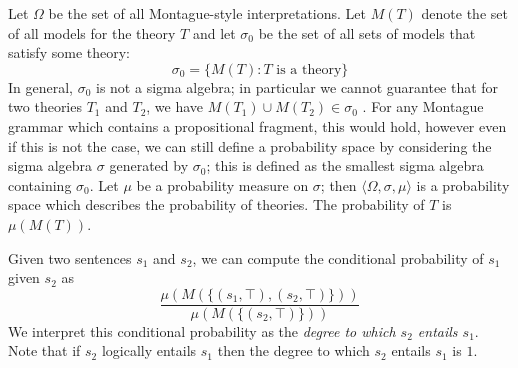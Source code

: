 \documentclass[11pt]{article}
\theoremstyle{definition}
\begin{document}
Let $\Omega$ be the set of all Montague-style interpretations. Let
$M(T)$ denote the set of all models for the theory $T$ and let
$\sigma_0$ be the set of all sets of models that satisfy some theory:
$$\sigma_0 = \{M(T) : T\text{ is a theory}\}$$
In general, $\sigma_0$ is not a sigma algebra; in particular we cannot
guarantee that for two theories $T_1$
and $T_2$, we have
$M(T_1)\cup M(T_2) \in \sigma_0$ . For any Montague grammar which contains a propositional
fragment, this would hold, however even if this is not the case, we
can still define a probability space by considering the sigma algebra
$\sigma$ generated by $\sigma_0$; this is defined as the smallest
sigma algebra containing $\sigma_0$. Let $\mu$ be a probability measure on $\sigma$; then
$\langle\Omega,\sigma,\mu\rangle$ is a probability space which
describes the probability of theories. The probability of $T$ is
$\mu(M(T))$.


Given two sentences $s_1$ and $s_2$, we can compute the conditional
probability of $s_1$ given $s_2$ as
$$\frac{\mu(M(\{(s_1, \top), (s_2, \top)\}))}{\mu(M(\{(s_2,\top)\}))}$$
We interpret this conditional probability as the {\em degree to which $s_2$ entails $s_1$\/}. Note that if $s_2$ logically entails $s_1$ then the degree to which  $s_2$ entails $s_1$ is $1$.

\end{document}
